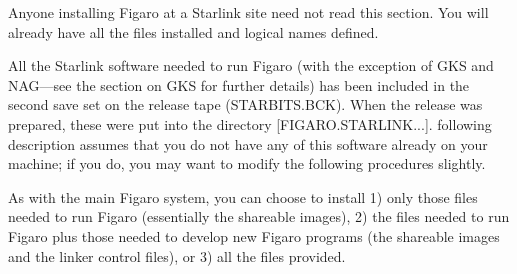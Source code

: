Anyone installing Figaro at a Starlink site need not read this section.  You
will already have all the files installed and logical names defined.

All the Starlink software needed to run Figaro (with the exception of GKS and
NAG---see the section on GKS for further details) has been included  in the
second save set on the release tape (STARBITS.BCK). When the  release was
prepared, these were put into the directory [FIGARO.STARLINK...].  following
description assumes that you do not have any of this software already on your
machine; if you do, you may want to modify the following procedures slightly.

As with the main Figaro system, you can choose to install 1) only those files
needed to run Figaro (essentially the shareable images), 2) the files needed to
run Figaro plus those needed to develop new Figaro programs (the shareable
images and the linker control files), or 3) all the files provided.

